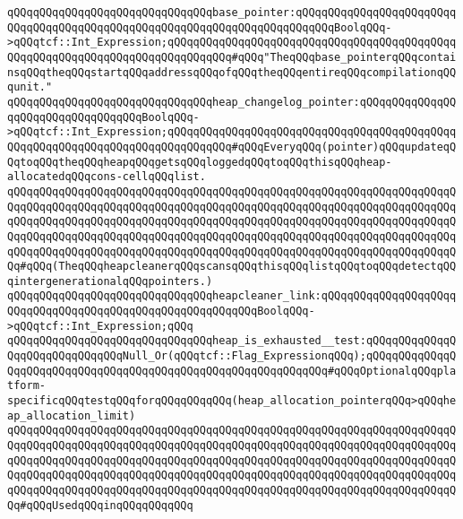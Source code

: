 \verb|qQQqqQQqqQQqqQQqqQQqqQQqqQQqqQQqbase_pointer:qQQqqQQqqQQqqQQqqQQqqQQqqQQqqQQqqQQqqQQqqQQqqQQqqQQqqQQqqQQqqQQqqQQqqQQqqQQqBoolqQQq->qQQqtcf::Int_Expression;qQQqqQQqqQQqqQQqqQQqqQQqqQQqqQQqqQQqqQQqqQQqqQQqqQQqqQQqqQQqqQQqqQQqqQQqqQQqqQQq#qQQq"TheqQQqbase_pointerqQQqcontainsqQQqtheqQQqstartqQQqaddressqQQqofqQQqtheqQQqentireqQQqcompilationqQQqunit."|\newline
\newline
\verb|qQQqqQQqqQQqqQQqqQQqqQQqqQQqqQQqheap_changelog_pointer:qQQqqQQqqQQqqQQqqQQqqQQqqQQqqQQqqQQqBoolqQQq->qQQqtcf::Int_Expression;qQQqqQQqqQQqqQQqqQQqqQQqqQQqqQQqqQQqqQQqqQQqqQQqqQQqqQQqqQQqqQQqqQQqqQQqqQQqqQQq#qQQqEveryqQQq(pointer)qQQqupdateqQQqtoqQQqtheqQQqheapqQQqgetsqQQqloggedqQQqtoqQQqthisqQQqheap-allocatedqQQqcons-cellqQQqlist.|\newline
\verb|qQQqqQQqqQQqqQQqqQQqqQQqqQQqqQQqqQQqqQQqqQQqqQQqqQQqqQQqqQQqqQQqqQQqqQQqqQQqqQQqqQQqqQQqqQQqqQQqqQQqqQQqqQQqqQQqqQQqqQQqqQQqqQQqqQQqqQQqqQQqqQQqqQQqqQQqqQQqqQQqqQQqqQQqqQQqqQQqqQQqqQQqqQQqqQQqqQQqqQQqqQQqqQQqqQQqqQQqqQQqqQQqqQQqqQQqqQQqqQQqqQQqqQQqqQQqqQQqqQQqqQQqqQQqqQQqqQQqqQQqqQQqqQQqqQQqqQQqqQQqqQQqqQQqqQQqqQQqqQQqqQQqqQQqqQQqqQQqqQQqqQQqqQQqqQQq#qQQq(TheqQQqheapcleanerqQQqscansqQQqthisqQQqlistqQQqtoqQQqdetectqQQqintergenerationalqQQqpointers.)|\newline
\newline
\verb|qQQqqQQqqQQqqQQqqQQqqQQqqQQqqQQqheapcleaner_link:qQQqqQQqqQQqqQQqqQQqqQQqqQQqqQQqqQQqqQQqqQQqqQQqqQQqqQQqqQQqBoolqQQq->qQQqtcf::Int_Expression;qQQq|\newline
\newline
\verb|qQQqqQQqqQQqqQQqqQQqqQQqqQQqqQQqheap_is_exhausted__test:qQQqqQQqqQQqqQQqqQQqqQQqqQQqqQQqNull_Or(qQQqtcf::Flag_ExpressionqQQq);qQQqqQQqqQQqqQQqqQQqqQQqqQQqqQQqqQQqqQQqqQQqqQQqqQQqqQQqqQQqqQQq#qQQqOptionalqQQqplatform-specificqQQqtestqQQqforqQQqqQQqqQQq(heap_allocation_pointerqQQq>qQQqheap_allocation_limit)|\newline
\verb|qQQqqQQqqQQqqQQqqQQqqQQqqQQqqQQqqQQqqQQqqQQqqQQqqQQqqQQqqQQqqQQqqQQqqQQqqQQqqQQqqQQqqQQqqQQqqQQqqQQqqQQqqQQqqQQqqQQqqQQqqQQqqQQqqQQqqQQqqQQqqQQqqQQqqQQqqQQqqQQqqQQqqQQqqQQqqQQqqQQqqQQqqQQqqQQqqQQqqQQqqQQqqQQqqQQqqQQqqQQqqQQqqQQqqQQqqQQqqQQqqQQqqQQqqQQqqQQqqQQqqQQqqQQqqQQqqQQqqQQqqQQqqQQqqQQqqQQqqQQqqQQqqQQqqQQqqQQqqQQqqQQqqQQqqQQqqQQqqQQqqQQqqQQqqQQq#qQQqUsedqQQqinqQQqqQQqqQQq|\newline
